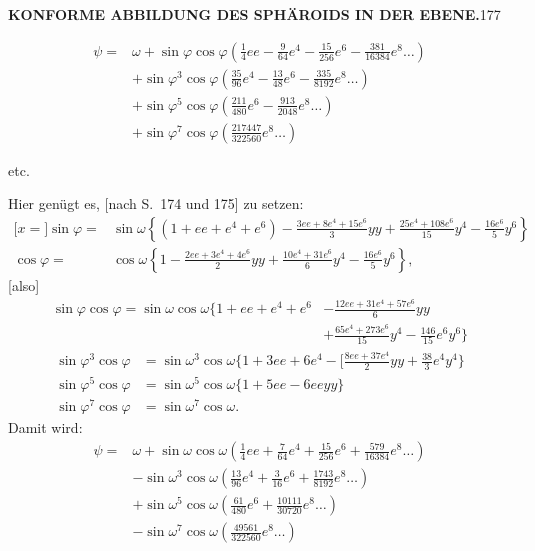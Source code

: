 \par\clearpage
\noindent\null\hfill{\small\textbf{KONFORME ABBILDUNG DES SPHÄROIDS IN DER EBENE.}}\hfill177\par\medskip
\[
\begin{aligned}
\psi={}&\omega+\sin\varphi\cos\varphi(\tfrac14ee-\tfrac9{64}e^4-\tfrac{15}{256}e^6-\tfrac{381}{16384}e^8\ldots)\\
&+\sin\varphi^3\cos\varphi(\tfrac{35}{96}e^4-\tfrac{13}{48}e^6-\tfrac{335}{8192}e^8\ldots)\\
&+\sin\varphi^5\cos\varphi(\tfrac{211}{480}e^6-\tfrac{913}{2048}e^8\ldots)\\
&+\sin\varphi^7\cos\varphi(\tfrac{217447}{322560}e^8\ldots)
\end{aligned}
\]
{\centering etc.\par}
Hier genügt es, [nach S.~174 und 175] zu setzen:
\[
\begin{aligned}
\mathopen{[}x={}]\sin\varphi={}&\sin\omega\left\{(1+ee+e^4+e^6)-\frac{3ee+8e^4+15e^6}{3}yy+\frac{25e^4+108e^6}{15}y^4-\frac{16e^6}{5}y^6\right\}\\
\cos\varphi={}&\cos\omega\left\{1-\frac{2ee+3e^4+4e^6}{2}yy+\frac{10e^4+31e^6}{6}y^4-\frac{16e^6}{5}y^6\right\},
\end{aligned}
\]
[also]
\[
\begin{aligned}
\sin\varphi\cos\varphi=\sin\omega\cos\omega\biggl\{1+ee+e^4+e^6&-\frac{12ee+31e^4+57e^6}{6}yy\\
&+\frac{65e^4+273e^6}{15}y^4-\frac{146}{15}e^6y^6\biggr\}
\end{aligned}
\]
\[
\begin{aligned}
\sin\varphi^3\cos\varphi&=\sin\omega^3\cos\omega\biggl\{1+3ee+6e^4-\biggl[\frac{8ee+37e^4}{2}yy+\frac{38}{3}e^4y^4\biggr\}\\
\sin\varphi^5\cos\varphi&=\sin\omega^5\cos\omega\{1+5ee-6eeyy\}\\
\sin\varphi^7\cos\varphi&=\sin\omega^7\cos\omega.
\end{aligned}
\]
Damit wird:
\[
\begin{aligned}
\psi={}&\omega+\sin\omega\cos\omega(\tfrac14ee+\tfrac7{64}e^4+\tfrac{15}{256}e^6+\tfrac{579}{16384}e^8\ldots)\\
&-\sin\omega^3\cos\omega(\tfrac{13}{96}e^4+\tfrac3{16}e^6+\tfrac{1743}{8192}e^8\ldots)\\
&+\sin\omega^5\cos\omega(\tfrac{61}{480}e^6+\tfrac{10111}{30720}e^8\ldots)\\
&-\sin\omega^7\cos\omega(\tfrac{49561}{322560}e^8\ldots)
\end{aligned}
\]
